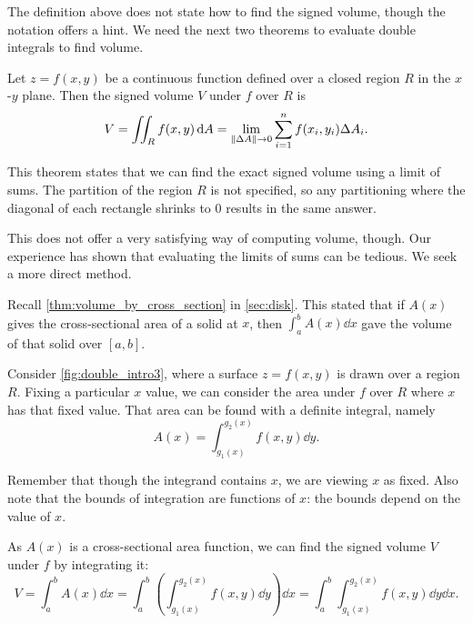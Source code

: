 The definition above does not state how to find the signed volume, though the notation offers a hint. We need the next two theorems to evaluate double integrals to find volume.

\begin{theorem}\label{thm:double_int}%
Let $z=f(x,y)$ be a continuous function defined over a closed region $R$ in the $x$-$y$ plane. Then the signed volume $V$ under $f$ over $R$ is
\[V = \iint_R f(x,y)\operatorname{d}\! A = \lim_{\left\lVert \Delta A \right\rVert\to 0}\sum_{i=1}^n f(x_i,y_i)\Delta A_i.\]
\end{theorem}

This theorem states that we can find the exact signed volume using a limit of sums. The partition of the region $R$ is not specified, so any partitioning where the diagonal of each rectangle shrinks to 0 results in the same answer. 

This does not offer a very satisfying way of computing volume, though. Our experience has shown that evaluating the limits of sums can be tedious. We seek a more direct method.

Recall \autoref{thm:volume_by_cross_section} in \autoref{sec:disk}. This stated that if $A(x)$ gives the cross-sectional area of a solid at $x$, then $\int_a^b A(x)\dd x$ gave the volume of that solid over $[a,b]$. 

Consider \autoref{fig:double_intro3}, where a surface $z=f(x,y)$ is drawn over a region $R$. Fixing a particular $x$ value, we can consider the area under $f$ over $R$ where $x$ has that fixed value. That area can be found with a definite integral, namely
\[ A(x)=\int_{g_1(x)}^{g_2(x)} f(x,y)\dd y.\]

Remember that though the integrand contains $x$, we are viewing $x$ as fixed. Also note that the bounds of integration are functions of $x$: the bounds depend on the value of $x$. 


As $A(x)$ is a cross-sectional area function, we can find the signed volume $V$ under $f$ by integrating it:
\[
V = \int_a^b A(x)\dd x = \int_a^b\left(\int_{g_1(x)}^{g_2(x)} f(x,y)\dd y\right)\dd x
= \int_a^b\int_{g_1(x)}^{g_2(x)} f(x,y)\dd y\dd x.
\]

